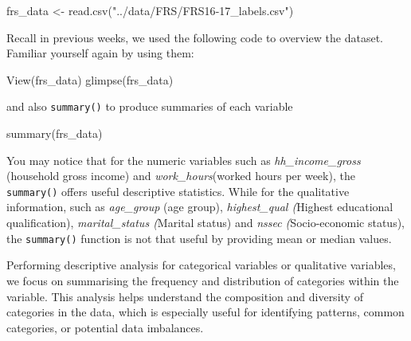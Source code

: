\documentclass[
  letterpaper,
  DIV=11,
  numbers=noendperiod]{scrreprt}
\newenvironment{Shaded}{\begin{snugshade}}{\end{snugshade}}
\newcommand{\CommentTok}[1]{\textcolor[rgb]{0.37,0.37,0.37}{#1}}
\newcommand{\FunctionTok}[1]{\textcolor[rgb]{0.28,0.35,0.67}{#1}}
\newcommand{\NormalTok}[1]{\textcolor[rgb]{0.00,0.23,0.31}{#1}}
\newcommand{\OtherTok}[1]{\textcolor[rgb]{0.00,0.23,0.31}{#1}}
\newcommand{\SpecialCharTok}[1]{\textcolor[rgb]{0.37,0.37,0.37}{#1}}
\newcommand{\StringTok}[1]{\textcolor[rgb]{0.13,0.47,0.30}{#1}}
\begin{document}
\begin{Shaded}
\begin{Highlighting}[]
\NormalTok{frs\_data }\OtherTok{\textless{}{-}} \FunctionTok{read.csv}\NormalTok{(}\StringTok{"../data/FRS/FRS16{-}17\_labels.csv"}\NormalTok{)}
\end{Highlighting}
\end{Shaded}

Recall in previous weeks, we used the following code to overview the
dataset. Familiar yourself again by using them:

\begin{Shaded}
\begin{Highlighting}[]
\FunctionTok{View}\NormalTok{(frs\_data)}
\FunctionTok{glimpse}\NormalTok{(frs\_data)}
\end{Highlighting}
\end{Shaded}

and also \texttt{summary()} to produce summaries of each variable

\begin{Shaded}
\begin{Highlighting}[]
\FunctionTok{summary}\NormalTok{(frs\_data)}
\end{Highlighting}
\end{Shaded}

You may notice that for the numeric variables such as
\emph{hh\_income\_gross} (household gross income) and
\emph{work\_hours}(worked hours per week), the \texttt{summary()} offers
useful descriptive statistics. While for the qualitative information,
such as \emph{age\_group} (age group), \emph{highest\_qual (}Highest
educational qualification), \emph{marital\_status (}Marital status) and
\emph{nssec (}Socio-economic status), the \texttt{summary()} function is
not that useful by providing mean or median values.

Performing descriptive analysis for categorical variables or qualitative
variables, we focus on summarising the frequency and distribution of
categories within the variable. This analysis helps understand the
composition and diversity of categories in the data, which is especially
useful for identifying patterns, common categories, or potential data
imbalances.

\begin{Shaded}
\end{Shaded}
\end{document}
